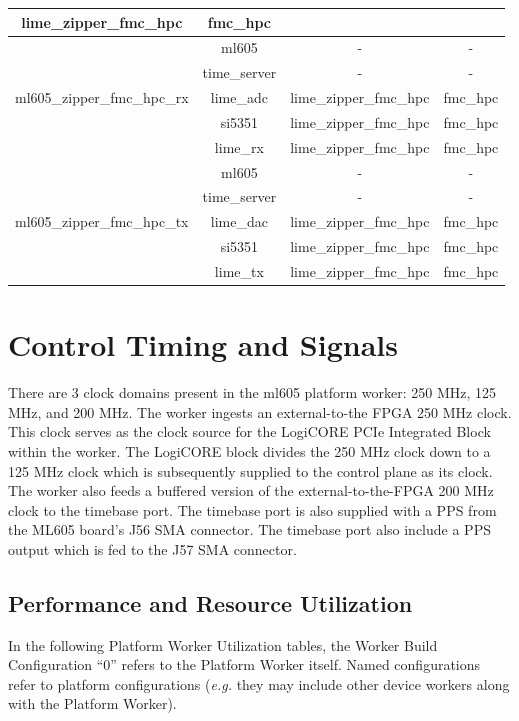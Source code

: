 \documentclass{article}
\edef\ecomp{ml605}
\begin{document}
\begin{tabular}{|c|c|c|c|}
	lime\_zipper\_fmc\_hpc & fmc\_hpc \\
	\hline
	\multirow{5}{*}{ml605\_zipper\_fmc\_hpc\_rx}&
	ml605 & - & - \\ &time\_server & - & - \\
	&lime\_adc & lime\_zipper\_fmc\_hpc & fmc\_hpc \\  &si5351 &
	lime\_zipper\_fmc\_hpc & fmc\_hpc \\ &lime\_rx &
	lime\_zipper\_fmc\_hpc & fmc\_hpc \\
	\hline
	\multirow{5}{*}{ml605\_zipper\_fmc\_hpc\_tx}&
	ml605 & - & - \\ &time\_server & - & - \\
	&lime\_dac & lime\_zipper\_fmc\_hpc & fmc\_hpc \\  &si5351 &
	lime\_zipper\_fmc\_hpc & fmc\_hpc \\ &lime\_tx &
	lime\_zipper\_fmc\_hpc & fmc\_hpc \\
	\hline
\end{tabular}

\newpage	
\section*{Control Timing and Signals}
There are 3 clock domains present in the ml605 platform worker: 250 MHz, 125 MHz, and 200 MHz. The worker ingests an external-to-the FPGA 250 MHz clock. This clock serves as the clock source for the LogiCORE PCIe Integrated Block within the worker. The LogiCORE block divides the 250 MHz clock down to a 125 MHz clock which is subsequently supplied to the control plane as its clock. The worker also feeds a buffered version of the external-to-the-FPGA 200 MHz clock to the timebase port. The timebase port is also supplied with a PPS from the ML605 board's J56 SMA connector. The timebase port also include a PPS output which is fed to the J57 SMA connector.

\begin{landscape}
\section*{Performance and Resource Utilization}
In the following Platform Worker Utilization tables, the Worker Build Configuration ``0'' refers to the Platform Worker itself. Named configurations refer to platform configurations (\textit{e.g.} they may include other device workers along with the Platform Worker).\\\\

\end{landscape}
\end{document}
